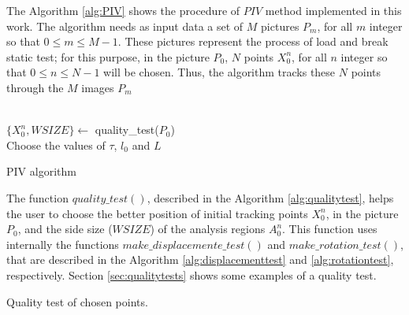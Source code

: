 
The Algorithm \ref{alg:PIV} shows the procedure of $PIV$ method implemented in this work.
The algorithm needs as input data a set of $M$ pictures $P_m$, for all
$m$ integer so that  $0 \leq m \leq M-1$. 
These pictures represent the process of load and break static test; for 
this purpose, in the picture $P_0$, $N$ points $X_0^n$, for all
$n$ integer so that  $0 \leq n \leq N-1$ will be chosen.
Thus, the algorithm tracks these $N$ points through the $M$ images $P_m$

\begin{algorithm}[!h]


 ~\\
 $\{X_0^n,WSIZE\} \leftarrow$ quality\_test($P_0$)\;
 ~\\
 Choose the values of $\tau$, $l_0$ and $L$\;
 ~\\
\caption{PIV algorithm}
\label{alg:PIV} 
\end{algorithm}
The function $quality\_test()$, described in the Algorithm \ref{alg:qualitytest}, 
helps the user to choose
the better position of initial tracking points $X_{0}^n$, in the picture
$P_0$, and the side size ($WSIZE$) of the analysis regions $A_{0}^n$.
This function uses internally the functions 
$make\_displacemente\_test()$ and 
$make\_rotation\_test()$, that are described in the Algorithm \ref{alg:displacementtest}
and \ref{alg:rotationtest}, respectively. Section \ref{sec:qualitytests}
shows some examples of a quality test.


\begin{algorithm}[!h]

\caption{Quality test of chosen points.}
\label{alg:qualitytest} 
\end{algorithm}


